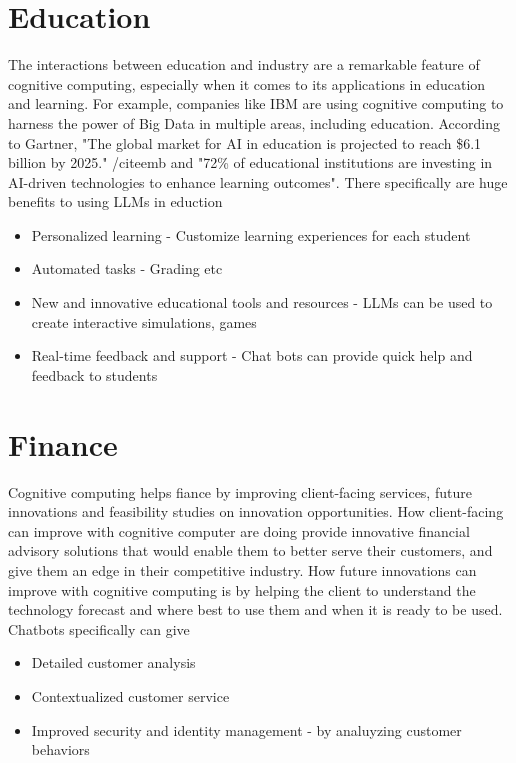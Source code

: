 \documentclass{article}
\begin{document}
\section{Education}
The interactions between education and industry are a remarkable feature of cognitive computing, especially when it comes to its applications in education and learning. For example, companies like IBM are using cognitive computing to harness the power of Big Data in multiple areas, including education.
According to Gartner, "The global market for AI in education is projected to reach \$6.1 billion by 2025." /cite{emb} and "72\% of educational institutions are investing in AI-driven technologies to enhance learning outcomes".
There specifically are huge benefits to using LLMs in eduction 
\begin{itemize}
    \item Personalized learning - Customize learning experiences for each student
    \item Automated tasks - Grading etc
    \item New and innovative educational tools and resources - LLMs can be used to create interactive simulations, games
    \item Real-time feedback and support - Chat bots can provide quick help and feedback to students
\end{itemize} \cite{packtpub}

\section{Finance}
Cognitive computing helps fiance by improving client-facing services, future innovations and feasibility studies on innovation opportunities. How client-facing can improve with cognitive computer are doing provide innovative financial advisory solutions that would enable them to better serve their customers, and give them an edge in their competitive industry. How future innovations can improve with cognitive computing is by helping the client to understand the technology forecast and where best to use them and when it is ready to be used.
Chatbots specifically can give
\begin{itemize}
    \item Detailed customer analysis
    \item Contextualized customer service
    \item Improved security and identity management - by analuyzing customer behaviors
\end{itemize} \cite{pulse}
\end{document}
